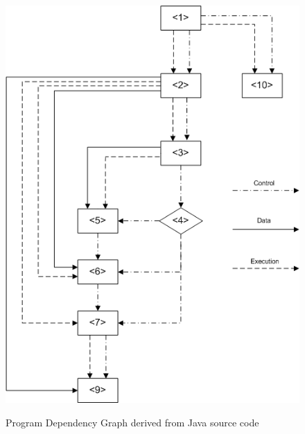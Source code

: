\documentclass{report}
\begin{document}
\begin{figure}[h]
  \centering
  \includegraphics[scale=0.55]{Figures/exist-alg/pdg-example.png}\\[0.1cm]
  \caption[Example of program dependency graph derived from java code]{Program Dependency Graph derived from Java source code}
  \label{fig:pdg-ex}
\end{figure}
\end{document}

